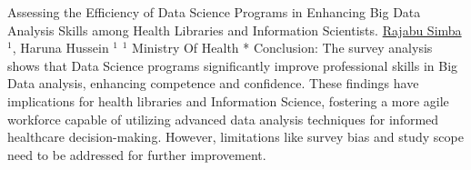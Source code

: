\begin{abstract_online}{Assessing the Efficiency of Data Science Programs in Enhancing Big Data Analysis Skills among Health Libraries and Information Scientists.}{%
    \underline{Rajabu Simba}$^{1}$, Haruna Hussein $^{1}$}{%
    }{%
    $^1$ Ministry Of Health *\newline{}
    }
Conclusion: The survey analysis shows that Data Science programs significantly improve professional skills in Big Data analysis, enhancing competence and confidence. These findings have implications for health libraries and Information Science, fostering a more agile workforce capable of utilizing advanced data analysis techniques for informed healthcare decision-making. However, limitations like survey bias and study scope need to be addressed for further improvement.

\end{abstract_online}

